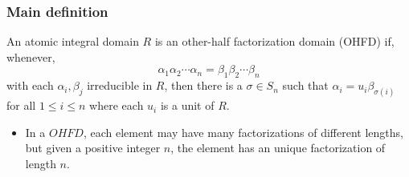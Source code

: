 \begin{frame}
  \frametitle{Main definition}
  \begin{definition}
    An atomic integral domain $R$ is an \alert{other-half factorization domain (OHFD)} if, whenever,
    $$ \alpha_1 \alpha_2 \cdots \alpha_n = \beta_1 \beta_2 \cdots \beta_n $$
    with each $\alpha_i, \beta_j$ irreducible in $R$, then there is a $\sigma \in S_n$ such that $\alpha_i = u_i \beta_{\sigma(i)}$ for all $1 \leq i \leq n$ where each $u_i$ is a unit of $R$.
  \end{definition}
  \pause
  \begin{itemize}
    \item In a $OHFD$, each element may have many factorizations of different lengths, but given a positive integer $n$, the element has an unique factorization of length $n$.
  \end{itemize}
\end{frame}
